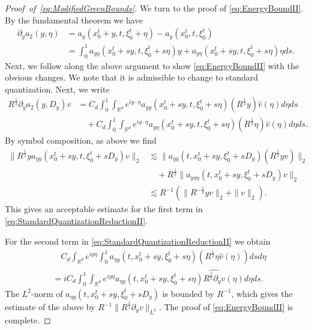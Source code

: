 \documentclass{amsart}
\theoremstyle{definition}
\newcommand{\R}{\mathbb{R}}
\begin{document}
\begin{proof}[Proof~of~\eqref{eq:ModifiedGreenBounds}]
We turn to the proof of \eqref{eq:EnergyBoundII}. By the fundamental theorem we have
\begin{equation*}
\begin{split}
\partial_y a_2(y,\eta) &= a_y(x_0^t + y,t, \xi_0^t + \eta) - a_y(x_0^t,t,\xi_0^t) \\
&= \int_0^1 a_{yy}(x_0^t + s y,t, \xi_0^t + s \eta) y + a_{y \eta}(x_0^t+sy,t, \xi_0^t + s \eta) \eta ds.
\end{split}
\end{equation*}
Next, we follow along the above argument to show \eqref{eq:EnergyBoundII} with the obvious changes. We note that it is admissible to change to standard quantization. Next, we write
\begin{equation}
\label{eq:StandardQuantizationReductionII}
\begin{split}
R^{\frac{1}{2}} \partial_y a_2(y,D_y) v &= C_d \int_0^1 \int_{\R^d} e^{i y \cdot \eta} a_{yy}(x_0^t+sy,t,\xi_0^t+s\eta) (R^{\frac{1}{2}} y) \hat{v}(\eta) d\eta ds \\
&\quad + C_d \int_0^1 \int_{\R^d} e^{i y \cdot \eta} a_{y \eta}(x_0^t + s y,t,\xi_0^t + s \eta) (R^{\frac{1}{2}} \eta) \hat{v}(\eta) d\eta ds.
\end{split}
\end{equation}
By symbol composition, as above we find
\begin{equation*}
\begin{split}
\| R^{\frac{1}{2}} y a_{yy}(x_0^t + s y, t, \xi_0^t + s D_y) v \|_2 &\lesssim \| a_{yy}(t,x_0^t + sy,\xi_0^t+s D_y) (R^{\frac{1}{2}} y v) \|_2 \\
&\quad + R^{\frac{1}{2}} \| a_{y \eta \eta}(t,x_0^t+sy,\xi_0^t+sD_y) v \|_2 \\
&\lesssim R^{-1} (\| R^{-\frac{1}{2}} y v \|_2 + \| v \|_2 ).
\end{split}
\end{equation*}
This gives an acceptable estimate for the first term in \eqref{eq:StandardQuantizationReductionII}.

\smallskip

For the second term in \eqref{eq:StandardQuantizationReductionII} we obtain
\begin{equation*}
\begin{split}
&\quad C_d \int_{\R^d} e^{i y \eta} \int_0^1 a_{\eta y}(t,x_0^t+sy,\xi_0^t+s\eta) (R^{\frac{1}{2}} \eta \hat{v}(\eta)) ds d\eta \\
&= i C_d \int_0^1 \int_{\R^d} e^{i y \eta} a_{\eta y}(t,x_0^t+sy,\xi_0^t+s\eta) \widehat{R^{\frac{1}{2}} \partial_y v}(\eta) d\eta ds.
\end{split}
\end{equation*}
The $L^2$-norm of $a_{\eta y}(t,x_0^t+sy,\xi_0^t + s D_y)$ is bounded by $R^{-1}$, which gives the estimate of the above by $R^{-1} \| R^{\frac{1}{2}} \partial_y v \|_{L^2}$. The proof of \eqref{eq:EnergyBoundII} is complete.
\smallskip


\end{proof}
\end{document}
